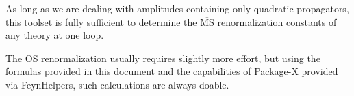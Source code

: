 \documentclass[../FeynCalcManual.tex]{subfiles}
\begin{document}
As long as we are dealing with amplitudes containing only quadratic
propagators, this toolset is fully sufficient to determine the
\(\overline{\textrm{MS}}\) renormalization constants of any theory at
one loop.

The OS renormalization usually requires slightly more effort, but using
the formulas provided in this document and the capabilities of Package-X
provided via FeynHelpers, such calculations are always doable.
\end{document}
